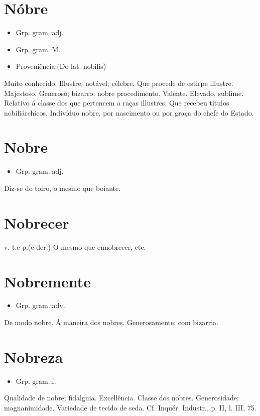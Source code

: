 \section{Nóbre}
\begin{itemize}
\item {Grp. gram.:adj.}
\end{itemize}
\begin{itemize}
\item {Grp. gram.:M.}
\end{itemize}
\begin{itemize}
\item {Proveniência:(Do lat. \textunderscore nobilis\textunderscore )}
\end{itemize}
Muito conhecido.
Illustre; notável; célebre.
Que procede de estirpe illustre.
Majestoso.
Generoso; bizarro: \textunderscore nobre procedimento\textunderscore .
Valente.
Elevado, sublime.
Relativo á classe dos que pertencem a raças illustres.
Que recebeu títulos nobiliárchicos.
Indivíduo nobre, por nascimento ou por graça do chefe do Estado.
\section{Nobre}
\begin{itemize}
\item {Grp. gram.:adj.}
\end{itemize}
Diz-se do toiro, o mesmo que \textunderscore boiante\textunderscore .
\section{Nobrecer}
\textunderscore v. t.\textunderscore  e \textunderscore p.\textunderscore  (e der.)
O mesmo que \textunderscore ennobrecer\textunderscore , etc.
\section{Nobremente}
\begin{itemize}
\item {Grp. gram.:adv.}
\end{itemize}
De modo nobre.
Á maneira dos nobres.
Generosamente; com bizarria.
\section{Nobreza}
\begin{itemize}
\item {Grp. gram.:f.}
\end{itemize}
Qualidade de nobre; fidalguia.
Excellência.
Classe dos nobres.
Generosidade; magnanimidade.
Variedade de tecido de seda. Cf. \textunderscore Inquér. Industr.\textunderscore , p. II, l. III, 75.
